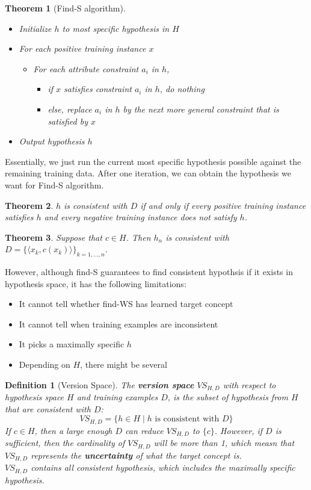 \documentclass[12pt]{article}
\newtheorem{definition}{Definition}[section]
\newtheorem{theorem}{Theorem}[section]
\theoremstyle{definition}
\begin{document}
\begin{theorem}[Find-S algorithm]
\hfill\\\normalfont
\begin{itemize}
	\item Initialize $h$ to most specific hypothesis in $H$
	\item For each positive training instance $x$
	\begin{itemize}
		\item For each attribute constraint $a_i$ in $h$,
			\begin{itemize}
				\item if $x$ satisfies constraint $a_i$ in $h$, do nothing
				\item else, replace $a_i$ in $h$ by the next more general constraint that is satisfied by $x$
			\end{itemize}
	\end{itemize}
	\item Output hypothesis $h$
\end{itemize}
\end{theorem}
Essentially, we just run the current most specific hypothesis possible against the remaining training data. After one iteration, we can obtain the hypothesis we want for Find-S algorithm.
\begin{theorem}
\normalfont $h$ is consistent with $D$ if and only if every positive training instance satisfies $h$ and every negative training instance does not satisfy $h$.
\end{theorem}
\begin{theorem}
\normalfont Suppose that $c\in H$. Then $h_n$ is consistent with $D=\{\langle x_k, c(x_k)\rangle\}_{k=1,\ldots, n}$.
\end{theorem}
However, although find-S guarantees to find consistent hypothsis if it exists in hypothesis space, it has the following limitations:
\begin{itemize}
	\item It cannot tell whether find-WS has learned target concept
	\item It cannot tell when training examples are inconsistent
	\item It picks a maximally specific $h$
	\item Depending on $H$, there might be several
\end{itemize}
\begin{definition}[Version Space]
\normalfont The \textbf{version space} $VS_{H,D}$ with respect to hypothesis space $H$ and training examples $D$, is the subset of hypothesis from $H$ that are consistent with $D$:
\[
VS_{H,D}=\{h\in H \mid h \text{ is consistent with } D\}
\]
If $c\in H$, then a large enough $D$ can reduce $VS_{H,D}$ to $\{c\}$. However, if $D$ is sufficient, then the cardinality of $VS_{H,D}$ will be more than 1, which measn that $VS_{H,D}$ represents the \textbf{uncertainty} of what the target concept is.\\
$VS_{H,D}$ contains all consistent hypothesis, which includes the maximally specific hypothesis.
\end{definition}
\end{document}

